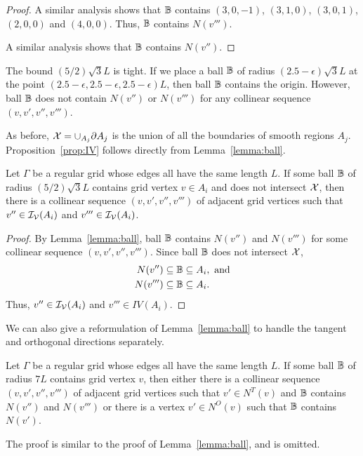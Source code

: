\begin{proof}
A similar analysis shows that $\mathbb{B}$ contains $(3,0,-1)$,
$(3,1,0)$, $(3,0,1)$, $(2,0,0)$ and $(4,0,0)$.
Thus, $\mathbb{B}$ contains $N(v''')$.

A similar analysis shows that $\mathbb{B}$ contains $N(v'')$.
\end{proof}
The bound $(5/2) \sqrt{3} L$ is tight.
If we place a ball $\mathbb{B}$ of radius $(2.5-\epsilon) \sqrt{3}L$ at 
the point $(2.5-\epsilon,2.5-\epsilon,2.5-\epsilon)L$,
then ball $\mathbb{B}$ contains the origin.
However, ball $\mathbb{B}$ does not contain $N(v'')$ or $N(v''')$
for any collinear sequence $(v,v',v'',v''')$.

As before, $\mathcal{X} = \cup_{A_j} \partial A_j$ is the union of all the boundaries
of smooth regions $A_j$.
Proposition~\ref{prop:IV} follows directly from Lemma~\ref{lemma:ball}.
\begin{propIV}
Let $\Gamma$ be a regular grid whose edges all have the same length $L$.
If some ball $\mathbb{B}$ of radius $(5/2)\sqrt{3}L$ contains grid vertex $v \in A_i$
and does not intersect $\mathcal{X}$,
then there is a collinear sequence $(v,v',v'',v''')$ 
of adjacent grid vertices 
such that $v'' \in \mathcal{I_V}(A_i)$ and $v''' \in \mathcal{I_V}(A_i)$.
\end{propIV}

\begin{proof}
By Lemma~\ref{lemma:ball}, ball $\mathbb{B}$ contains $N(v'')$ and $N(v''')$
for some collinear sequence $(v,v',v'',v''')$.
Since ball $\mathbb{B}$ does not intersect $\mathcal{X}$,
\begin{align*}
N(v'') & \subseteq \mathbb{B} \subseteq A_i, \mbox{  and} \\
N(v''') & \subseteq \mathbb{B} \subseteq A_i.
\end{align*}
Thus, $v'' \in \mathcal{I_V}(A_i)$ and $v''' \in IV(A_i)$.
\end{proof}

We can also give a reformulation of Lemma~\ref{lemma:ball}
to handle the tangent and orthogonal directions separately.
\begin{lemma}
Let $\Gamma$ be a regular grid whose edges all have the same length $L$.
If some ball $\mathbb{B}$ of radius $7L$ contains grid vertex $v$,
then either there is a collinear sequence $(v,v',v'',v''')$ 
of adjacent grid vertices
such that $v' \in N^T(v)$ and $\mathbb{B}$ contains $N(v'')$ and $N(v''')$
or there is a vertex $v' \in N^O(v)$ such that $\mathbb{B}$ contains $N(v')$.
\label{lemma:ball2}
\end{lemma}

The proof is similar to the proof of Lemma~\ref{lemma:ball},
and is omitted.

